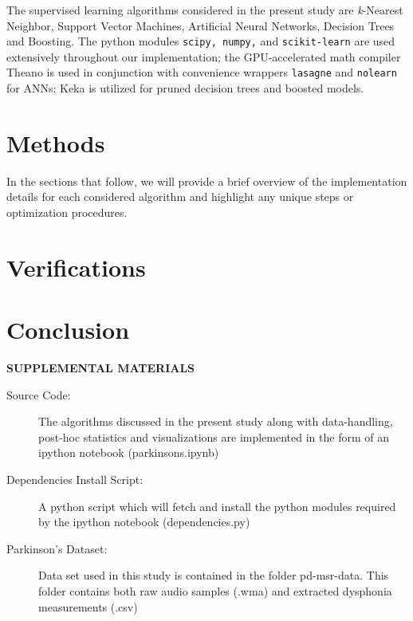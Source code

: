 \documentclass[12pt]{article}
\begin{document}
The supervised learning algorithms considered in the present study are \textit{k}-Nearest Neighbor, Support Vector Machines, Artificial Neural Networks, Decision Trees and Boosting. The python modules \texttt{scipy, numpy,} and \texttt{scikit-learn} \cite{scipy} \cite{scikit-learn} are used extensively  throughout our implementation; the GPU-accelerated math compiler Theano \cite{bergstra+al:2010-scipy} is used in conjunction with convenience wrappers \texttt{lasagne} and \texttt{nolearn} for ANNs; Keka \cite{Hall2009} is utilized for pruned decision trees and boosted models.\cite{Tsanas2010}

\section{Methods}
\label{sec:meth}
In the sections that follow, we will provide a brief overview of the implementation details for each considered algorithm and highlight any unique steps or optimization procedures. 


\section{Verifications}
\label{sec:verify}

\section{Conclusion}
\label{sec:conc}


\bigskip
\begin{center}
{\large\bf SUPPLEMENTAL MATERIALS}
\end{center}

\begin{description}

\item[Source Code:] The algorithms discussed in the present study along with data-handling, post-hoc statistics and visualizations are implemented in the form of an ipython notebook (parkinsons.ipynb)

\item[Dependencies Install Script:] A python script which will fetch and install the  python modules required by the ipython notebook (dependencies.py)

\item[Parkinson's Dataset:] Data set used in this study is contained in the folder pd-msr-data. This folder contains both raw audio samples (.wma) and extracted dysphonia measurements (.csv)

\end{description}



\end{document}
